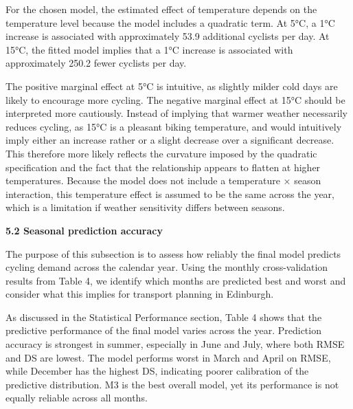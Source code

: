 \documentclass[
]{article}
\begin{document}
For the chosen model, the estimated effect of temperature depends on the temperature level because the model includes a quadratic term. At 5°C, a 1°C increase is associated with approximately 53.9 additional cyclists per day. At 15°C, the fitted model implies that a 1°C increase is associated with approximately 250.2 fewer cyclists per day.

The positive marginal effect at 5°C is intuitive, as slightly milder cold days are likely to encourage more cycling. The negative marginal effect at 15°C should be interpreted more cautiously. Instead of implying that warmer weather necessarily reduces cycling, as 15°C is a pleasant biking temperature, and would intuitively imply either an increase rather or a slight decrease over a significant decrease. This therefore more likely reflects the curvature imposed by the quadratic specification and the fact that the relationship appears to flatten at higher temperatures. Because the model does not include a temperature × season interaction, this temperature effect is assumed to be the same across the year, which is a limitation if weather sensitivity differs between seasons.

\textbf{5.2 Seasonal prediction accuracy}

The purpose of this subsection is to assess how reliably the final model predicts cycling demand across the calendar year. Using the monthly cross-validation results from Table 4, we identify which months are predicted best and worst and consider what this implies for transport planning in Edinburgh.

As discussed in the Statistical Performance section, Table 4 shows that the predictive performance of the final model varies across the year. Prediction accuracy is strongest in summer, especially in June and July, where both RMSE and DS are lowest. The model performs worst in March and April on RMSE, while December has the highest DS, indicating poorer calibration of the predictive distribution. M3 is the best overall model, yet its performance is not equally reliable across all months.
\end{document}
